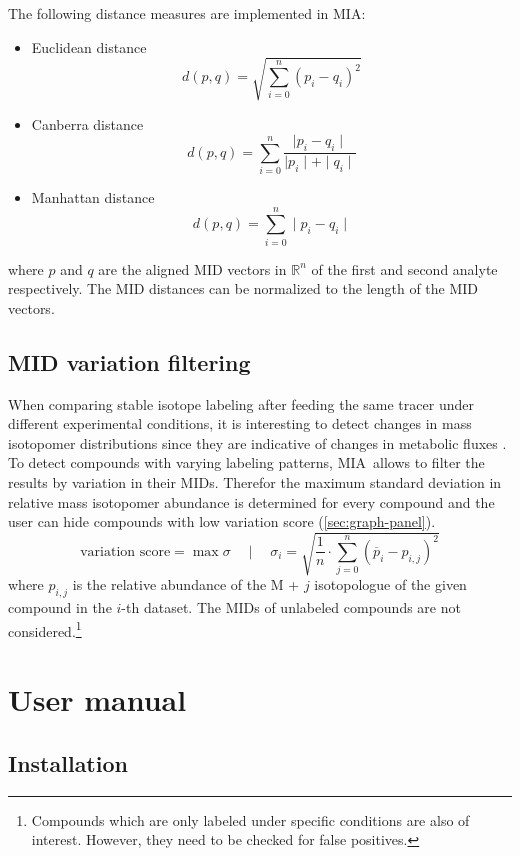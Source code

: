 \documentclass[a4paper,12pt]{scrartcl}
\newcommand*\app{\textsc{MIA}}
\begin{document}
The following distance measures are implemented in \app:

\begin{itemize}
\item Euclidean distance \[d(p, q) = \sqrt{\sum_{i=0}^{n} (p_i - q_i)^2} \]
\item Canberra distance \[d(p, q) = \sum_{i=0}^{n} \frac{\mid p_i - q_i \mid}{\mid p_i \mid + \mid q_i \mid}\]
\item Manhattan distance \[d(p, q) = \sum_{i=0}^{n} \mid p_i - q_i \mid \]
\end{itemize}

where $p$ and $q$ are the aligned MID vectors in $\mathbb{R}^n$ of the first and second analyte respectively. The MID distances can be normalized to the length of the MID vectors.

\subsection{MID variation filtering}
\label{sec:variation}

When comparing stable isotope labeling after feeding the same tracer under different experimental conditions, it is interesting to detect changes in mass isotopomer distributions since they are indicative of changes in metabolic fluxes \cite{Weindl2015b,Weindl2016}. To detect compounds with varying labeling patterns, \app\ allows to filter the results by variation in their MIDs. Therefor the maximum standard deviation in relative mass isotopomer abundance is determined for every compound and the user can hide compounds with low variation score (\ref{sec:graph-panel}).
\[\text{variation score} = \max \sigma \quad \mid \quad \sigma_i = \sqrt{\frac{1}{n} \cdot \sum_{j=0}^{n} (\overline{p}_i - p_{i,j})^2} \] where $p_{i,j}$ is the relative abundance of the M + $j$ isotopologue of the given compound in the $i$-th dataset. The MIDs of unlabeled compounds are not considered.\footnote{Compounds which are only labeled under specific conditions are also of interest. However, they need to be checked for false positives.}

\section{User manual}

\subsection{Installation}
\end{document}
